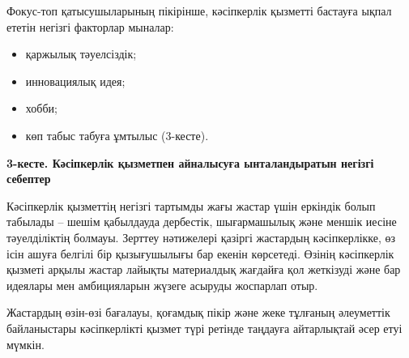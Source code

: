 Фокус-топ қатысушыларының пікірінше, кәсіпкерлік қызметті бастауға ықпал
ететін негізгі факторлар мыналар:

\begin{itemize}
\item
  қаржылық тәуелсіздік;
\item
  инновациялық идея;
\item
  хобби;
\item
  көп табыс табуға ұмтылыс (3-кесте).
\end{itemize}

{\bfseries 3-кесте. Кәсіпкерлік қызметпен айналысуға ынталандыратын негізгі
себептер}


Кәсіпкерлік қызметтің негізгі тартымды жағы жастар үшін еркіндік болып
табылады -- шешім қабылдауда дербестік, шығармашылық және меншік иесіне
тәуелділіктің болмауы. Зерттеу нәтижелері қазіргі жастардың
кәсіпкерлікке, өз ісін ашуға белгілі бір қызығушылығы бар екенін
көрсетеді. Өзінің кәсіпкерлік қызметі арқылы жастар лайықты материалдық
жағдайға қол жеткізуді және бар идеялары мен амбицияларын жүзеге асыруды
жоспарлап отыр.

Жастардың өзін-өзі бағалауы, қоғамдық пікір және жеке тұлғаның
әлеуметтік байланыстары кәсіпкерлікті қызмет түрі ретінде таңдауға
айтарлықтай әсер етуі мүмкін.

